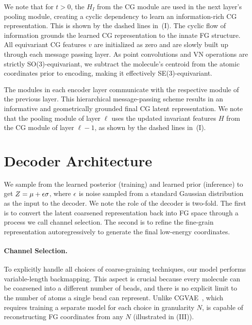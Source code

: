 We note that for $t > 0$, the $H_I$ from the CG module are used in the next layer's pooling module, creating a cyclic dependency to learn an information-rich CG representation. This is shown by the dashed lines in~(I). The cyclic flow of information grounds the learned CG representation to the innate FG structure. All equivariant CG features $v$ are initialized as zero and are slowly built up through each message passing layer. As point convolutions and VN operations are strictly SO(3)-equivariant, we subtract the molecule’s centroid from the atomic coordinates prior to encoding, making it effectively SE(3)-equivariant.

The modules in each encoder layer communicate with the respective module of the previous layer. This hierarchical message-passing scheme results in an informative and geometrically grounded final CG latent representation. We note that the pooling module of layer $\ell$ uses the updated invariant features $H$ from the CG module of layer $\ell - 1$, as shown by the dashed lines in~(I).

\section{Decoder Architecture}
\label{section:decoder}
\vspace{-1ex}

We sample from the learned posterior (training) and learned prior (inference) to get $Z = \mu + {\epsilon} \sigma$, where ${\epsilon}$ is noise sampled from a standard Gaussian distribution as the input to the decoder. 
We note the role of the decoder is two-fold. The first is to convert the latent coarsened representation back into FG space through a process we call channel selection. The second is to refine the fine-grain representation autoregressively to generate the final low-energy coordinates.

\vspace{-1ex}
\paragraph{Channel Selection.} To explicitly handle all choices of coarse-graining techniques, our model performs variable-length backmapping.
This aspect is crucial because every molecule can be coarsened into a different number of beads, and there is no explicit limit to the number of atoms a single bead can represent. Unlike CGVAE~\citep{CGVAE}, which requires training a separate model for each choice in granularity $N$, \model is capable of reconstructing FG coordinates from any $N$ (illustrated in (III)).

